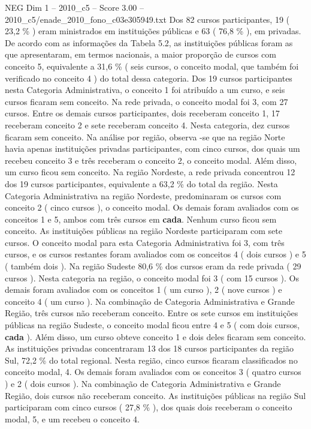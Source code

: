 \begin{textsample}{NEG Dim 1 – 2010\_c5 – Score 3.00 – 2010\_c5/enade\_2010\_fono\_c03e305949.txt}
Dos 82 cursos participantes, 19 ( 23,2 \% ) eram ministrados em instituições públicas e 63 ( 76,8 \% ), em privadas.
De acordo com as informações da Tabela 5.2, as instituições públicas foram as que apresentaram, em termos nacionais, a maior proporção de cursos com conceito 5, equivalente a 31,6 \% ( seis cursos, o conceito modal, que também foi verificado no conceito 4 ) do total dessa categoria.
Dos 19 cursos participantes nesta Categoria Administrativa, o conceito 1 foi atribuído a um curso, e seis cursos ficaram sem conceito.
Na rede privada, o conceito modal foi 3, com 27 cursos.
Entre os demais cursos participantes, dois receberam conceito 1, 17 receberam conceito 2 e sete receberam conceito 4.
Nesta categoria, dez cursos ficaram sem conceito.
Na análise por região, observa -se que na região Norte havia apenas instituições privadas participantes, com cinco cursos, dos quais um recebeu conceito 3 e três receberam o conceito 2, o conceito modal.
Além disso, um curso ficou sem conceito.
Na região Nordeste, a rede privada concentrou 12 dos 19 cursos participantes, equivalente a 63,2 \% do total da região.
Nesta Categoria Administrativa na região Nordeste, predominaram os cursos com conceito 2 ( cinco cursos ), o conceito modal.
Os demais foram avaliados com os conceitos 1 e 5, ambos com três cursos em \textbf{cada}.
Nenhum curso ficou sem conceito.
As instituições públicas na região Nordeste participaram com sete cursos.
O conceito modal para esta Categoria Administrativa foi 3, com três cursos, e os cursos restantes foram avaliados com os conceitos 4 ( dois cursos ) e 5 ( também dois ).
Na região Sudeste 80,6 \% dos cursos eram da rede privada ( 29 cursos ).
Nesta categoria na região, o conceito modal foi 3 ( com 15 cursos ).
Os demais foram avaliados com os conceitos 1 ( um curso ), 2 ( nove cursos ) e conceito 4 ( um curso ).
Na combinação de Categoria Administrativa e Grande Região, três cursos não receberam conceito.
Entre os sete cursos em instituições públicas na região Sudeste, o conceito modal ficou entre 4 e 5 ( com dois cursos, \textbf{cada} ).
Além disso, um curso obteve conceito 1 e dois deles ficaram sem conceito.
As instituições privadas concentraram 13 dos 18 cursos participantes da região Sul, 72,2 \% do total regional.
Nesta região, cinco cursos ficaram classificados no conceito modal, 4.
Os demais foram avaliados com os conceitos 3 ( quatro cursos ) e 2 ( dois cursos ).
Na combinação de Categoria Administrativa e Grande Região, dois cursos não receberam conceito.
As instituições públicas na região Sul participaram com cinco cursos ( 27,8 \% ), dos quais dois receberam o conceito modal, 5, e um recebeu o conceito 4.

\end{textsample}

